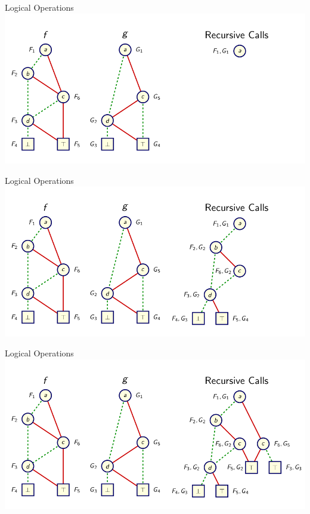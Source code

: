 \documentclass{beamer}
\begin{document}
\begin{frame}{Logical Operations}
\includegraphics[scale=0.35]{ex1.png}
\end{frame}

\begin{frame}{Logical Operations}
\includegraphics[scale=0.35]{ex5.png}
\end{frame}

\begin{frame}{Logical Operations}
\includegraphics[scale=0.35]{ex6.png}
\end{frame}
\end{document}

